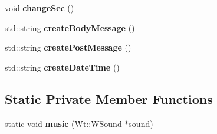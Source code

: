 \begin{DoxyCompactItemize}
\item 
void {\bfseries change\+Sec} ()\hypertarget{classGroupsSchedulerControlWidget_a0fedb95feb0a6e9fb00a0d7f2cb187b4}{}\label{classGroupsSchedulerControlWidget_a0fedb95feb0a6e9fb00a0d7f2cb187b4}

\item 
std\+::string {\bfseries create\+Body\+Message} ()\hypertarget{classGroupsSchedulerControlWidget_aa8111aca2cfbc117213d9e7dfd5a503b}{}\label{classGroupsSchedulerControlWidget_aa8111aca2cfbc117213d9e7dfd5a503b}

\item 
std\+::string {\bfseries create\+Post\+Message} ()\hypertarget{classGroupsSchedulerControlWidget_aef3a307a1c642bc4385d62156a1ec76f}{}\label{classGroupsSchedulerControlWidget_aef3a307a1c642bc4385d62156a1ec76f}

\item 
std\+::string {\bfseries create\+Date\+Time} ()\hypertarget{classGroupsSchedulerControlWidget_a03abe13834f18994a47725c22f4437b4}{}\label{classGroupsSchedulerControlWidget_a03abe13834f18994a47725c22f4437b4}

\end{DoxyCompactItemize}
\subsection*{Static Private Member Functions}
\begin{DoxyCompactItemize}
\item 
static void {\bfseries music} (Wt\+::\+W\+Sound $\ast$sound)\hypertarget{classGroupsSchedulerControlWidget_a04f9fc065e234ccb7fdecbd951d8fbb7}{}\label{classGroupsSchedulerControlWidget_a04f9fc065e234ccb7fdecbd951d8fbb7}

\end{DoxyCompactItemize}
